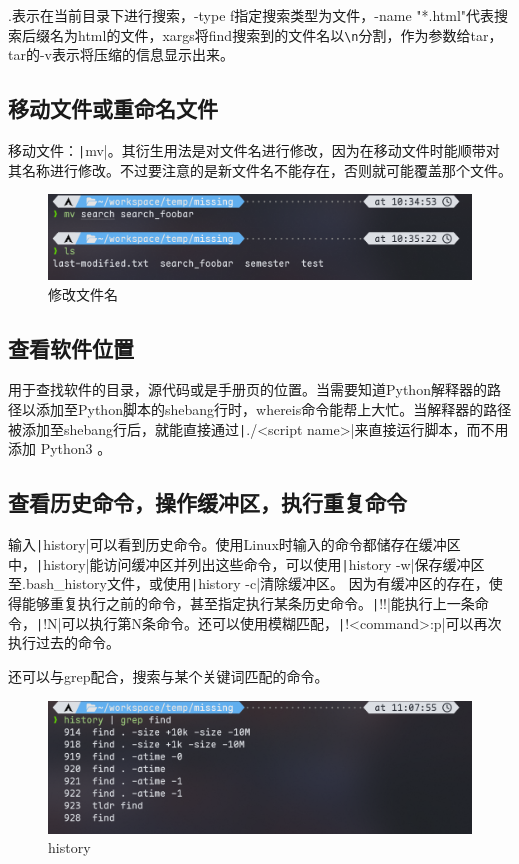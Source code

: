 \documentclass[fontset=ubuntu]{ctexart}
\begin{document}
\begin{sloppypar}
.表示在当前目录下进行搜索，-type f指定搜索类型为文件，-name "*.html"代表搜索后缀名为html的文件，xargs将find搜索到的文件名以\verb|\n|分割，作为参数给tar，tar的-v表示将压缩的信息显示出来。

\subsection{移动文件或重命名文件}
移动文件：\texttt|mv|。其衍生用法是对文件名进行修改，因为在移动文件时能顺带对其名称进行修改。不过要注意的是新文件名不能存在，否则就可能覆盖那个文件。
\begin{figure}[htb]
    \centering
    \includegraphics[width=0.75\linewidth]{mv_1.png}
    \caption{修改文件名}
    \label{fig:mv_1}
\end{figure}

\subsection{查看软件位置}
用于查找软件的目录，源代码或是手册页的位置。当需要知道Python解释器的路径以添加至Python脚本的shebang行时，whereis命令能帮上大忙。当解释器的路径被添加至shebang行后，就能直接通过\texttt|./<script name>|来直接运行脚本，而不用添加 Python3 。

\subsection{查看历史命令，操作缓冲区，执行重复命令}
输入\texttt|history|可以看到历史命令。使用Linux时输入的命令都储存在缓冲区中，\texttt|history|能访问缓冲区并列出这些命令，可以使用\texttt|history -w|保存缓冲区至.bash\_history文件，或使用\texttt|history -c|清除缓冲区。
因为有缓冲区的存在，使得能够重复执行之前的命令，甚至指定执行某条历史命令。\texttt|!!|能执行上一条命令，\texttt|!N|可以执行第N条命令。还可以使用模糊匹配，\texttt|!<command>:p|可以再次执行过去的命令。

还可以与grep配合，搜索与某个关键词匹配的命令。
\begin{figure}[htb]
    \centering
    \includegraphics[width=0.75\linewidth]{history_1.png}
    \caption{history}
    \label{fig:history_1}
\end{figure}


\end{sloppypar}
\end{document}

